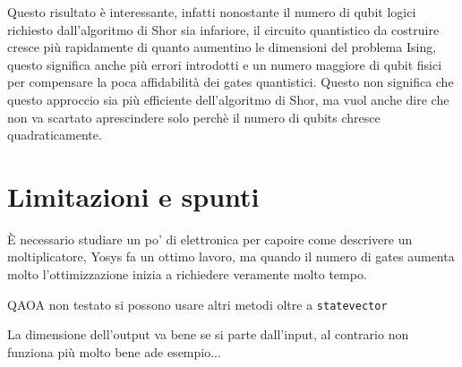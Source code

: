\documentclass[]{article}
\begin{document}
	Questo risultato è interessante, infatti nonostante il numero di qubit logici richiesto dall'algoritmo di Shor sia infariore, il circuito quantistico da costruire cresce più rapidamente di quanto aumentino le dimensioni del problema Ising, questo significa anche più errori introdotti e un numero maggiore di qubit fisici per compensare la poca affidabilità dei gates quantistici. Questo non significa che questo approccio sia più efficiente dell'algoritmo di Shor, ma vuol anche dire che non va scartato aprescindere solo perchè il numero di qubits chresce quadraticamente.
	
	\section{Limitazioni e spunti}
	\label{sec:limit}
	È necessario studiare un po' di elettronica per capoire come descrivere un moltiplicatore, Yosys fa un ottimo lavoro, ma quando il numero di gates aumenta molto l'ottimizzazione inizia a richiedere veramente molto tempo.
	
	QAOA non testato si possono usare altri metodi oltre a \texttt{statevector}
	
	La dimensione dell'output va bene se si parte dall'input, al contrario non funziona più molto bene ade esempio...
	
\end{document}
